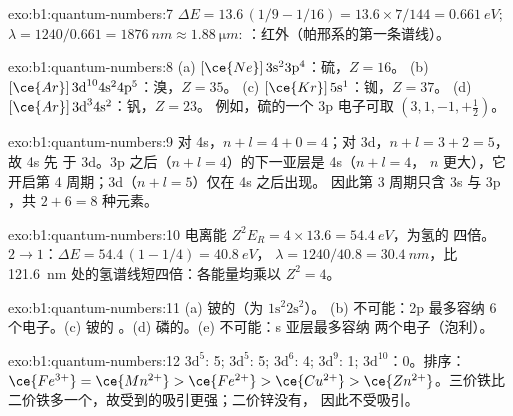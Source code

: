 \begin{solution}{exo:b1:quantum-numbers:7}
$\Delta E = 13.6\,(1/9 - 1/16) = 13.6 \times 7/144 = \qty{0.661}{eV}$;
$\lambda = 1240/0.661 = \qty{1876}{nm} \approx \qty{1.88}{\micro m}$:
：红外（帕邢系的第一条谱线）。
\end{solution}

\begin{solution}{exo:b1:quantum-numbers:8}
(a) $[\ce{Ne}]\,3\text{s}^2 3\text{p}^4$：硫，$Z = 16$。
(b) $[\ce{Ar}]\,3\text{d}^{10} 4\text{s}^2 4\text{p}^5$：溴，$Z = 35$。
(c) $[\ce{Kr}]\,5\text{s}^1$：铷，$Z = 37$。
(d) $[\ce{Ar}]\,3\text{d}^3 4\text{s}^2$：钒，$Z = 23$。
例如，硫的一个 3p 电子可取 $(3, 1, -1, +\tfrac12)$。
\end{solution}

\begin{solution}{exo:b1:quantum-numbers:9}
对 4s，$n + l = 4 + 0 = 4$；对 3d，$n + l = 3 + 2 = 5$，故 4s 先
于 3d。3p 之后（$n + l = 4$）的下一亚层是 4s（$n + l = 4$，
$n$ 更大），它开启第 4 周期；3d（$n + l = 5$）仅在 4s 之后出现。
因此第 3 周期只含 3s 与 3p ，共 $2 + 6 = 8$ 种元素。
\end{solution}

\begin{solution}{exo:b1:quantum-numbers:10}
电离能 $Z^2E_R = 4 \times 13.6 = \qty{54.4}{eV}$，为氢的
四倍。$2 \to 1$：$\Delta E = 54.4\,(1 - 1/4) = \qty{40.8}{eV}$，
$\lambda = 1240/40.8 = \qty{30.4}{nm}$，比
\qty{121.6}{nm} 处的氢谱线短四倍：各能量均乘以 $Z^2 = 4$。
\end{solution}

\begin{solution}{exo:b1:quantum-numbers:11}
(a) 铍的（为 $1\text{s}^2 2\text{s}^2$）。
(b) 不可能：2p 最多容纳 6 个电子。(c) 铍的
。(d) 磷的。(e) 不可能：s 亚层最多容纳
两个电子（泡利）。
\end{solution}

\begin{solution}{exo:b1:quantum-numbers:12}
 $3\text{d}^5$: 5;  $3\text{d}^5$: 5; 
$3\text{d}^6$: 4;  $3\text{d}^9$: 1; 
$3\text{d}^{10}$：0。排序：$\ce{Fe^{3+}} = \ce{Mn^{2+}} > \ce{Fe^{2+}}
> \ce{Cu^{2+}} > \ce{Zn^{2+}}$。三价铁比
二价铁多一个，故受到的吸引更强；二价锌没有，
因此不受吸引。
\end{solution}

